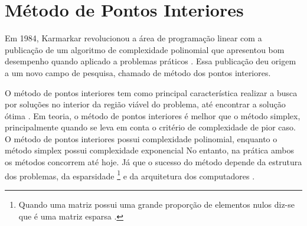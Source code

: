 \section{Método de Pontos Interiores}
Em 1984, Karmarkar revolucionou a área de programação linear com a publicação de um algoritmo de complexidade polinomial que apresentou bom desempenho quando aplicado a problemas práticos \cite{MaculanPI}. Essa publicação deu origem a um novo campo de pesquisa, chamado de método dos pontos interiores. 

O método de pontos interiores tem como principal característica realizar a busca por soluções no interior da região viável do problema, até encontrar a solução ótima \cite{Pinto}.
Em teoria, o método de pontos interiores é melhor que o método simplex, principalmente quando se leva em conta o critério de complexidade de pior caso. O método de pontos interiores possui complexidade polinomial, enquanto o método simplex possui complexidade exponencial No entanto, na prática ambos os métodos concorrem até hoje. Já que o sucesso do método depende da estrutura dos problemas, da esparsidade \footnote{Quando uma matriz possui uma grande proporção de elementos nulos diz-se que é uma matriz esparsa \cite{Munari}.} e da arquitetura dos computadores \cite{MaculanPI}.
